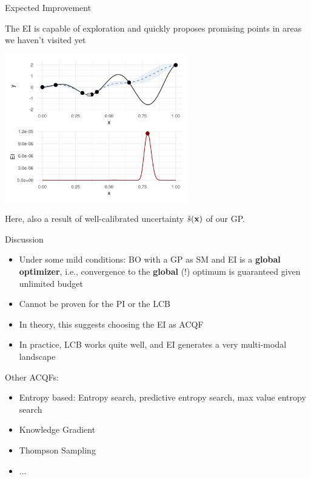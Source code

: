 \documentclass[11pt,compress,t,notes=noshow, xcolor=table]{beamer}
\begin{document}
\begin{frame}{Expected Improvement}

The EI is capable of exploration and quickly proposes promising points in areas we haven't visited yet

\begin{center}
  \includegraphics[width = 0.6\textwidth]{figure_man/bayesian_loop_6.png}
\end{center}

Here, also a result of well-calibrated uncertainty $\hat{s}(\mathbf{x})$ of our GP.

\end{frame}

\begin{frame}{Discussion}

\begin{itemize}
  \item Under some mild conditions: BO with a GP as SM and EI is a \textbf{global optimizer}, i.e., convergence to the \textbf{global} (!) optimum is guaranteed given unlimited budget
  \item Cannot be proven for the PI or the LCB
  \item In theory, this suggests choosing the EI as ACQF
  \item In practice, LCB works quite well, and EI generates a very multi-modal landscape
\end{itemize}

\vspace*{0.3cm}

Other ACQFs:
\begin{itemize}
  \item Entropy based: Entropy search, predictive entropy search, max value entropy search
  \item Knowledge Gradient
  \item Thompson Sampling
  \item ...
\end{itemize}

\end{frame}

\endlecture
\end{document}
